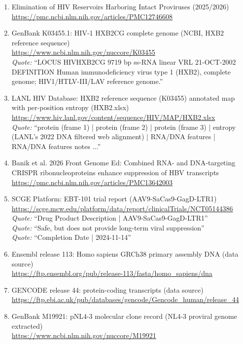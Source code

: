 \begin{enumerate}
\item [39] Elimination of HIV Reservoirs Harboring Intact Proviruses (2025/2026) \\ \url{https://pmc.ncbi.nlm.nih.gov/articles/PMC12746608}

\item [48] GenBank K03455.1: HIV-1 HXB2CG complete genome (NCBI, HXB2 reference sequence) \\ \url{https://www.ncbi.nlm.nih.gov/nuccore/K03455}
  \\ {\sloppy \emph{Quote:} ``LOCUS HIVHXB2CG 9719 bp ss-RNA linear VRL 21-OCT-2002 DEFINITION Human immunodeficiency virus type 1 (HXB2), complete genome; HIV1/HTLV-III/LAV reference genome.''}

\item [51] LANL HIV Database: HXB2 reference sequence (K03455) annotated map with per-position entropy (HXB2.xlsx) \\ \url{https://www.hiv.lanl.gov/content/sequence/HIV/MAP/HXB2.xlsx}
  \\ {\sloppy \emph{Quote:} ``protein (frame 1) | protein (frame 2) | protein (frame 3) | entropy (LANL's 2022 DNA filtered web alignment) | RNA/DNA features | RNA/DNA features notes ...''}

\item [54] Banik et al. 2026 Front Genome Ed: Combined RNA- and DNA-targeting CRISPR ribonucleoproteins enhance suppression of HBV transcripts \\ \url{https://pmc.ncbi.nlm.nih.gov/articles/PMC13642003}

\item [55] SCGE Platform: EBT-101 trial report (AAV9-SaCas9-GagD-LTR1) \\ \url{https://scge.mcw.edu/platform/data/report/clinicalTrials/NCT05144386}
  \\ {\sloppy \emph{Quote:} ``Drug Product Description | AAV9-SaCas9-GagD-LTR1''}
  \\ {\sloppy \emph{Quote:} ``Safe, but does not provide long-term viral suppression''}
  \\ {\sloppy \emph{Quote:} ``Completion Date | 2024-11-14''}

\item [56] Ensembl release 113: Homo sapiens GRCh38 primary assembly DNA (data source) \\ \url{https://ftp.ensembl.org/pub/release-113/fasta/homo_sapiens/dna}

\item [57] GENCODE release 44: protein-coding transcripts (data source) \\ \url{https://ftp.ebi.ac.uk/pub/databases/gencode/Gencode_human/release_44}

\item [58] GenBank M19921: pNL4-3 molecular clone record (NL4-3 proviral genome extracted) \\ \url{https://www.ncbi.nlm.nih.gov/nuccore/M19921}

\end{enumerate}
